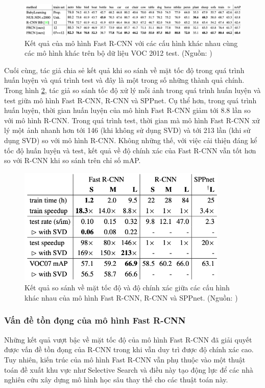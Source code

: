 {    \begin{figure}[H]
        \centering
        \includegraphics[width=15cm] {images/fast_rcnn_results_3}
        \caption{Kết quả của mô hình Fast R-CNN với các cấu hình khác nhau cùng các mô hình khác trên bộ dữ liệu VOC 2012 test. (Nguồn: \cite{girshick2015fast})}
        \label{fig:fast_rcnn_results_3}
    \end{figure}

    \noindent
    Cuối cùng, tác giả chia sẻ kết quả khi so sánh về mặt tốc độ trong quá trình huấn luyện và quá trình test và đây là một trong số những thành quả chính. \\
    Trong hình \ref{fig:fast_rcnn_results_4}, tác giả so sánh tốc độ xử lý mỗi ảnh trong quá trình huấn luyện và test giữa mô hình Fast R-CNN, R-CNN và SPPnet.
    Cụ thể hơn, trong quá trình huấn luyện, thời gian huấn luyện của mô hình Fast R-CNN giảm tới 8.8 lần so với mô hình R-CNN.
    Trong quá trình test, thời gian mà mô hình Fast R-CNN xử lý một ảnh nhanh hơn tới 146 (khi không sử dụng SVD) và tới 213 lần (khi sử dụng SVD) so với mô hình R-CNN.
    Không những thế, với việc cải thiện đáng kể tốc độ huấn luyện và test, kết quả về độ chính xác của Fast R-CNN vẫn tốt hơn so với R-CNN khi so sánh trên chỉ số mAP.

    \begin{figure}[H]
        \centering
        \includegraphics[width=10cm] {images/fast_rcnn_results_4}
        \caption{Kết quả so sánh về mặt tốc độ và độ chính xác giữa các cấu hình khác nhau của mô hình Fast R-CNN, R-CNN và SPPnet. (Nguồn: \cite{girshick2015fast})}
        \label{fig:fast_rcnn_results_4}
    \end{figure}

    \subsubsection{Vấn đề tồn đọng của mô hình Fast R-CNN}
    Những kết quả vượt bậc về mặt tốc độ của mô hình Fast R-CNN đã giải quyết được vấn đề tồn đọng của R-CNN trong khi vẫn duy trì được độ chính xác cao.
    Tuy nhiên, kiến trúc của mô hình Fast R-CNN vẫn phụ thuộc vào một thuật toán đề xuất khu vực như Selective Search và điều này tạo động lực để các nhà nghiên cứu xây dựng mô hình học sâu thay thế cho các thuật toán này.
}